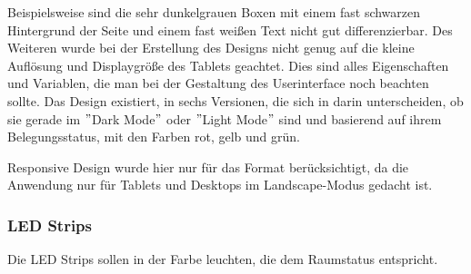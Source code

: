 Beispielsweise sind die sehr dunkelgrauen Boxen mit einem fast schwarzen Hintergrund der Seite und einem fast weißen Text nicht gut differenzierbar.
Des Weiteren wurde bei der Erstellung des Designs nicht genug auf die kleine Auflösung und Displaygröße des Tablets geachtet.
Dies sind alles Eigenschaften und Variablen, die man bei der Gestaltung des Userinterface noch beachten sollte.
\newline
Das Design existiert, in sechs Versionen, die sich in darin unterscheiden, ob sie gerade im \("\)Dark Mode\("\) oder \("\)Light Mode\("\) sind und basierend auf ihrem Belegungsstatus, mit den Farben rot, gelb und grün.
\newline
{}

\gls{Responsive Design} wurde hier nur für das Format berücksichtigt, da die Anwendung nur für Tablets und Desktops im Landscape-Modus gedacht ist.

\subsubsection{LED Strips}\label{subsec:led-strips}
Die LED Strips sollen in der Farbe leuchten, die dem Raumstatus entspricht.